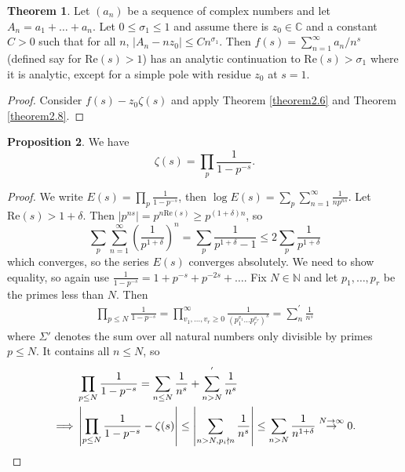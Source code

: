 \documentclass{article}
\theoremstyle{definition}
\newtheorem{theorem}{Theorem}[section]
\newtheorem{prop}[theorem]{Proposition}
\begin{document}
\begin{theorem}\label{theorem2.9}
    Let $(a_n)$ be a sequence of complex numbers and let $A_n = a_1 + \ldots + a_n$. Let $0 \le \sigma_1 \le 1$ and assume there is $z_0 \in \mathbb{C}$ and a constant $C>0$ such that for all $n$, $\left|A_n - n z_0\right|\le Cn^{\sigma_1}$. Then $f(s) = \sum_{n=1}^{\infty} a_n/n^s$ (defined say for $\text{Re}(s)>1$) has an analytic continuation to $\text{Re}(s)>\sigma_1$ where it is analytic, except for a simple pole with residue $z_0$ at $s=1$. 
\end{theorem}
\begin{proof}
    Consider $f(s)-z_0\zeta(s)$ and apply Theorem \ref{theorem2.6} and Theorem \ref{theorem2.8}.
\end{proof}
\begin{prop}\label{prop2.10}
    We have \[
    \zeta(s) = \prod_{p}^{} \frac{1}{1-p^{-s}}.
    \]
\end{prop}
\begin{proof}
    We write $E(s) = \prod_{p}^{} \frac{1}{1-p^{-s}}$, then $\log E(s) = \sum_{p}^{} \sum_{n=1}^{\infty} \frac{1}{np^{ns}}$. Let $\text{Re}(s)>1+\delta$. Then $\left|p^{ns}\right| = p^{n \text{Re}(s)} \ge p^{(1+\delta)n}$, so
    \[
    \sum_{p}^{} \sum_{n=1}^{\infty} \left(\frac{1}{p^{1+\delta}}\right)^n = \sum_{p}^{} \frac{1}{p^{1+\delta}-1} \le 2\sum_{p}^{} \frac{1}{p^{1+\delta}}
    \]
    which converges, so the series $E(s)$ converges absolutely. We need to show equality, so again use $\frac{1}{1-p^{-s}}= 1 + p^{-s} + p^{-2s} + \ldots$. Fix $N \in \mathbb{N}$ and let $p_1,\ldots,p_r$ be the primes less than $N$. Then 
    \begin{align*}
        \prod_{p\le N}^{}\frac{1}{1-p^{-s}} = \prod_{v_1,\ldots,v_r\ge 0}^{\infty} \frac{1}{(p_1^{v_1}\ldots p_r^{v_r})^s} = \sum_{n}^{'} \frac{1}{n^s} 
    \end{align*}
    where $\Sigma'$ denotes the sum over all natural numbers only divisible by primes $p\le N$. It contains all $n\le N$, so 
    \begin{align*}
        &\prod_{p\le N}^{} \frac{1}{1-p^{-s}} = \sum_{n\le N}^{} \frac{1}{n^s}  + \sum_{n>N}^{'} \frac{1}{n^s} \\
        \implies & \left|\prod_{p\le N}^{} \frac{1}{1-p^{-s}} - \zeta(s)\right| \le \left|\sum_{n>N, p_i \nmid n}^{} \frac{1}{n^s}\right|\le \sum_{n>N}^{} \frac{1}{n^{1+\delta}} \stackrel{N \to \infty}{\to} 0. 
        \qedhere
    \end{align*}
\end{proof}
\end{document}
